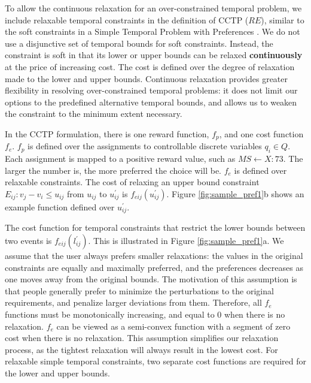 \documentclass[jair,twoside,11pt,theapa]{article}
\begin{document}

To allow the continuous relaxation for an over-constrained temporal problem, we
include relaxable temporal constraints in the definition of CCTP ($RE$), similar
to the soft constraints in a Simple Temporal Problem with Preferences
\cite{Rossi_STPP_2002}. We do not use a disjunctive set of temporal bounds for
soft constraints. Instead, the constraint is soft in that its lower or upper
bounds can be relaxed \textbf{continuously} at the price of increasing cost. The
cost is defined over the degree of relaxation made to the lower and upper
bounds. Continuous relaxation provides greater flexibility in resolving
over-constrained temporal problems: it does not limit our options to the
predefined alternative temporal bounds, and allows us to weaken the constraint
to the minimum extent necessary.


In the CCTP formulation, there is one reward function, $f_p$, and one cost
function $f_e$. $f_p$ is defined over the assignments to controllable discrete
variables $q_i\in Q$. Each assignment is mapped to a positive reward value, such
as $MS \leftarrow X:73$. The larger the number is, the more preferred the choice
will be. $f_e$ is defined over relaxable constraints. The cost of relaxing an
upper bound constraint $E_{ij}:v_j-v_i\leq u_{ij}$ from $u_{ij}$ to
$u_{ij}^{\prime}$ is $f_{eij}(u_{ij}^{\prime})$. Figure
\ref{fig:sample_pref1}b shows an example function defined over
$u_{ij}^{\prime}$.



The cost function for temporal constraints that restrict the lower bounds
between two events is $f_{eij}(l_{ij}^{\prime})$. This is illustrated in
Figure \ref{fig:sample_pref1}a. We assume that the user always prefers smaller
relaxations: the values in the original constraints are equally and maximally
preferred, and the preferences decreases as one moves away from the original
bounds. The motivation of this assumption is that people generally prefer to
minimize the perturbations to the original requirements, and penalize larger
deviations from them. Therefore, all $f_e$ functions must be monotonically
increasing, and equal to 0 when there is no relaxation. $f_e$ can be viewed as a
semi-convex \cite{Khatib01temporalconstraint} function with a segment of zero
cost when there is no relaxation. This assumption simplifies our relaxation
process, as the tightest relaxation will always result in the lowest cost. For
relaxable simple temporal constraints, two separate cost functions are required
for the lower and upper bounds.
\end{document}
